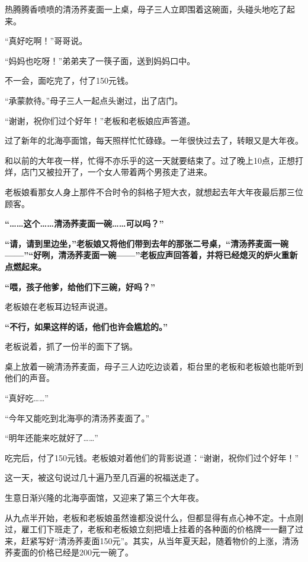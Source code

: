 \documentclass[UTF8,a4paper,8pt]{ctexbook}
\begin{document}
			  热腾腾香喷喷的清汤荞麦面一上桌，母子三人立即围着这碗面，头碰头地吃了起来。
			  
			  “真好吃啊！”哥哥说。
			  
			  “妈妈也吃呀！”弟弟夹了一筷子面，送到妈妈口中。
			  
			  不一会，面吃完了，付了150元钱。
			  
			  “承蒙款待。”母子三人一起点头谢过，出了店门。
			  
			  “谢谢，祝你们过个好年！”老板和老板娘应声答道。
			  
			  过了新年的北海亭面馆，每天照样忙忙碌碌。一年很快过去了，转眼又是大年夜。
			  
			  和以前的大年夜一样，忙得不亦乐乎的这一天就要结束了。过了晚上10点，正想打烊，店门又被拉开了，一个女人带着两个男孩走了进来。
			  
			  老板娘看那女人身上那件不合时令的斜格子短大衣，就想起去年大年夜最后那三位顾客。
			  
			\textbf{  “……这个……清汤荞麦面一碗……可以吗？”}
			  
			 \textbf{ “请，请到里边坐，”老板娘又将他们带到去年的那张二号桌，“清汤荞麦面一碗——”“好咧，清汤荞麦面一碗——”老板应声回答着，并将已经熄灭的炉火重新点燃起来。}
			  
			  \textbf{“喂，孩子他爹，给他们下三碗，好吗？”}
			  
			  老板娘在老板耳边轻声说道。
			  
			\textbf{  “不行，如果这样的话，他们也许会尴尬的。”}
			  
			  老板说着，抓了一份半的面下了锅。
			  
			  桌上放着一碗清汤荞麦面，母子三人边吃边谈着，柜台里的老板和老板娘也能听到他们的声音。
			  
			  “真好吃……”
			  
			  “今年又能吃到北海亭的清汤荞麦面了。”
			  
			  “明年还能来吃就好了……”
			  
			  吃完后，付了150元钱。老板娘对着他们的背影说道：“谢谢，祝你们过个好年！”
			  
			  这一天，被这句说过几十遍乃至几百遍的祝福送走了。
			  
			  生意日渐兴隆的北海亭面馆，又迎来了第三个大年夜。
			  
			  从九点半开始，老板和老板娘虽然谁都没说什么，但都显得有点心神不定。十点刚过，雇工们下班走了，老板和老板娘立刻把墙上挂着的各种面的价格牌一一翻了过来，赶紧写好“清汤荞麦面150元”。其实，从当年夏天起，随着物价的上涨，清汤荞麦面的价格已经是200元一碗了。
			  
\end{document}
